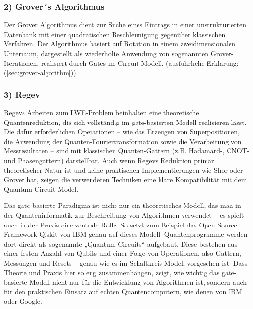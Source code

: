 \subsubsection*{2) Grover´s Algorithmus}
Der Grover Algorithmus dient zur Suche eines Eintrags in einer unstrukturierten Datenbank mit einer quadratischen Beschleunigung gegenüber klassischen Verfahren.
Der Algorithmus basiert auf Rotation in einem zweidimensionalen Unterraum, dargestellt als wiederholte Anwendung von sogenannten Grover-Iterationen, realisiert durch Gates im Circuit-Modell. (ausführliche Erklärung: (\autoref{sec:grover-algorithm}))  \autocite[248-254]{nielsen_quantum_2010}

\subsubsection*{3) Regev}
Regevs Arbeiten zum LWE-Problem beinhalten eine theoretische Quantenreduktion, die sich vollständig im gate-basierten Modell realisieren lässt. Die dafür erforderlichen Operationen – wie das Erzeugen von Superpositionen, die Anwendung der Quanten-Fouriertransformation sowie die Verarbeitung von Messresultaten – sind mit klassischen Quanten-Gattern (z.B. Hadamard-, CNOT- und Phasengattern) darstellbar. Auch wenn Regevs Reduktion primär theoretischer Natur ist und keine praktischen Implementierungen wie Shor oder Grover hat, zeigen die verwendeten Techniken eine klare Kompatibilität mit dem Quantum Circuit Model. \autocite{regev_lattices_2024}


Das gate-basierte Paradigma ist nicht nur ein theoretisches Modell, das man in der Quanteninformatik zur Beschreibung von Algorithmen verwendet – es spielt auch in der Praxis eine zentrale Rolle. So setzt zum Beispiel das Open-Source-Framework Qiskit von IBM genau auf dieses Modell: Quantenprogramme werden dort direkt als sogenannte „Quantum Circuits“ aufgebaut. Diese bestehen aus einer festen Anzahl von Qubits und einer Folge von Operationen, also Gattern, Messungen und Resets – genau wie es im Schaltkreis-Modell vorgesehen ist.
Dass Theorie und Praxis hier so eng zusammenhängen, zeigt, wie wichtig das gate-basierte Modell nicht nur für die Entwicklung von Algorithmen ist, sondern auch für den praktischen Einsatz auf echten Quantencomputern, wie denen von IBM oder Google.


